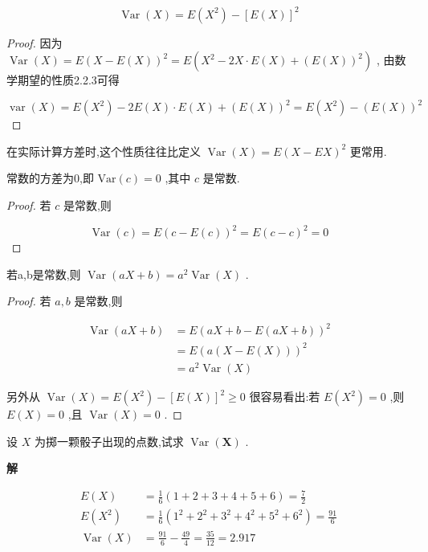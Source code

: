 \begin{property}
	\[
	\operatorname{Var}(X)=E\left(X^{2}\right)-[E(X)]^{2}
	\]
	
	\begin{proof}
		因为 $ \operatorname{Var}(X)=E(X-E(X))^{2}=E\left(X^{2}-2 X \cdot E(X)+(E(X))^{2}\right) $ , 由数学期望的性质2.2.3可得
		
		\[
		\operatorname{var}(X)=E\left(X^{2}\right)-2 E(X) \cdot E(X)+(E(X))^{2}=E\left(X^{2}\right)-(E(X))^{2}
		\]
		
	\end{proof}	
	
	在实际计算方差时,这个性质往往比定义 $ \operatorname{Var}(X)=E(X-E X)^{2} $ 更常用.
	
\end{property}

\begin{property}
	常数的方差为0,即 $ \mathrm{Var}(c)=0 $ ,其中 $ c $ 是常数.
\end{property}

\begin{proof}
	若 $ c $ 是常数,则
	
	\[
	\operatorname{Var}(c)=E(c-E(c))^{2}=E(c-c)^{2}=0
	\]
	
\end{proof}	


\begin{property}
	若a,b是常数,则 $ \operatorname{Var}(a X+b)=a^{2} \operatorname{Var}(X) $ .
\end{property}

\begin{proof}
	若 $ a,b $ 是常数,则
	
	\[
	\begin{aligned} \operatorname{Var}(a X+b) &=E(a X+b-E(a X+b))^{2} \\ &=E(a(X-E(X)))^{2} \\ &=a^{2} \operatorname{Var}(X) \end{aligned}
	\]
	
	另外从 $ \operatorname{Var}(X)=E\left(X^{2}\right)-[E(X)]^{2} \geqslant 0 $ 很容易看出:若 $ E(X^2)=0 $ ,则 $ E(X)=0 $ ,且 $ \operatorname{Var}(X)=0 $ .
	
\end{proof}

\begin{example}
	设 $ X $ 为掷一颗骰子出现的点数,试求 $ \operatorname{Var}(\boldsymbol{X}) $ .
	
	\textbf{解}
	
	\[
	\begin{array}{rl}
	{E(X)} & {=\frac{1}{6}(1+2+3+4+5+6)=\frac{7}{2}} \\ {E\left(X^{2}\right)} & {=\frac{1}{6}\left(1^{2}+2^{2}+3^{2}+4^{2}+5^{2}+6^{2}\right)=\frac{91}{6}} \\ {\operatorname{Var}(X)} & {=\frac{91}{6}-\frac{49}{4}=\frac{35}{12}=2.917}
	\end{array}
	\]
	
\end{example}

